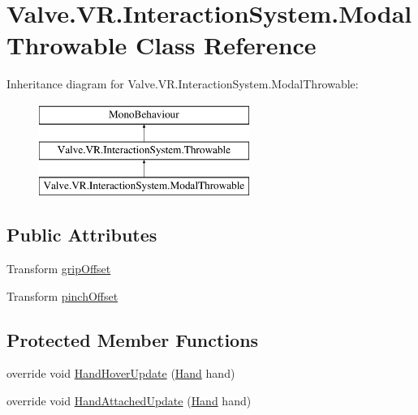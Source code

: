 \hypertarget{class_valve_1_1_v_r_1_1_interaction_system_1_1_modal_throwable}{}\section{Valve.\+V\+R.\+Interaction\+System.\+Modal\+Throwable Class Reference}
\label{class_valve_1_1_v_r_1_1_interaction_system_1_1_modal_throwable}
Inheritance diagram for Valve.\+V\+R.\+Interaction\+System.\+Modal\+Throwable\+:\begin{figure}[H]
\begin{center}
\leavevmode
\includegraphics[height=3.000000cm]{class_valve_1_1_v_r_1_1_interaction_system_1_1_modal_throwable}
\end{center}
\end{figure}
\subsection*{Public Attributes}
\begin{DoxyCompactItemize}
\item 
Transform \mbox{\hyperlink{class_valve_1_1_v_r_1_1_interaction_system_1_1_modal_throwable_a04d6a81705e8aed8d501a629e80a086d}{grip\+Offset}}
\item 
Transform \mbox{\hyperlink{class_valve_1_1_v_r_1_1_interaction_system_1_1_modal_throwable_a370037d59bf27830e49552a631c7b83c}{pinch\+Offset}}
\end{DoxyCompactItemize}
\subsection*{Protected Member Functions}
\begin{DoxyCompactItemize}
\item 
override void \mbox{\hyperlink{class_valve_1_1_v_r_1_1_interaction_system_1_1_modal_throwable_abd5ac3a0dce76c872f6f4266c68c6a5b}{Hand\+Hover\+Update}} (\mbox{\hyperlink{class_valve_1_1_v_r_1_1_interaction_system_1_1_hand}{Hand}} hand)
\item 
override void \mbox{\hyperlink{class_valve_1_1_v_r_1_1_interaction_system_1_1_modal_throwable_ab8c2156660c359719f3bbee9e123530d}{Hand\+Attached\+Update}} (\mbox{\hyperlink{class_valve_1_1_v_r_1_1_interaction_system_1_1_hand}{Hand}} hand)
\end{DoxyCompactItemize}
